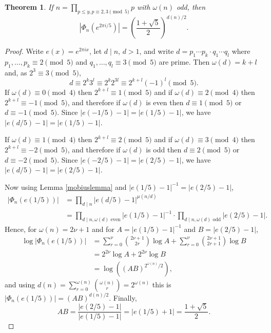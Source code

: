 \documentclass{article}
\newtheorem{theorem}{Theorem}
\theoremstyle{definition}
\begin{document}
\begin{theorem}
If $n=\prod_{p \leq y, p \equiv 2,3 \pmod{5}} p$ with $\omega(n)$  odd, then
\[
|\Phi_n(e^{2\pi i/5})| = \left( \frac{1+\sqrt{5}}{2} \right)^{d(n)/2}.
\]
\label{demr}
\end{theorem}
\begin{proof}
Write $e(x)=e^{2\pi ix}$, let $d \mid n$, $d>1$, and write $d=p_1\cdots p_k \cdot q_1 \cdots q_l$ where
$p_1,\ldots,p_k \equiv 2 \pmod{5}$ and $q_1,\ldots,q_l \equiv 3 \pmod{5}$ are prime. Then
$\omega(d) = k+l$ and, as $2^3 \equiv 3 \pmod{5}$,
\[
d \equiv 2^k 3^l \equiv 2^k 2^{3l} \equiv 2^{k+l} (-1)^l \pmod{5}.
\]
If $\omega(d) \equiv 0 \pmod{4}$ then $2^{k+l} \equiv 1 \pmod{5}$
and if $\omega(d) \equiv 2 \pmod{4}$ then
$2^{k+l}  \equiv -1 \pmod{5}$, and therefore if $\omega(d)$ is even then 
$d \equiv 1 \pmod{5}$ or $d \equiv -1 \pmod{5}$. Since $|e(-1/5)-1|=|e(1/5)-1|$, we have
$|e(d/5)-1| = |e(1/5)-1|$.

If $\omega(d) \equiv 1 \pmod{4}$ then $2^{k+l} \equiv 2 \pmod{5}$ and if $\omega(d) \equiv 3 \pmod{4}$ then
$2^{k+l} \equiv -2 \pmod{5}$, and therefore if $\omega(d)$ is odd then
$d \equiv 2 \pmod{5}$ or $d \equiv -2 \pmod{5}$. Since $|e(-2/5)-1|=|e(2/5)-1|$, we have
$|e(d/5)-1| = |e(2/5)-1|$.

Now using Lemma \ref{mobiuslemma} and $|e(1/5)-1|^{-1} =  |e(2/5)-1|$,
\begin{align*}
|\Phi_n(e(1/5))|&=\prod_{d \mid n} |e(d/5)-1|^{\mu(n/d)}\\
&=\prod_{d \mid n, \textrm{$\omega(d)$ even}}  |e(1/5)-1|^{-1}
\cdot \prod_{d \mid n, \textrm{$\omega(d)$ odd}}  |e(2/5)-1|.
\end{align*}
Hence, for $\omega(n)=2\nu+1$ and for $A= |e(1/5)-1|^{-1}$ and $B=|e(2/5)-1|$,
\begin{align*}
\log |\Phi_n(e(1/5))|&=\sum_{r=0}^\nu \binom{2\nu+1}{2r} \log A + \sum_{r=0}^\nu \binom{2\nu+1}{2r+1} \log B\\
&=2^{2\nu} \log A + 2^{2\nu} \log B\\
&=\log((AB)^{2^{\omega(n)} /2}),
\end{align*}
and using $d(n)=\sum_{r=0}^{\omega(n)} \binom{\omega(n)}{r} = 2^{\omega(n)}$ this is $|\Phi_n(e(1/5))| = (AB)^{d(n)/2}$.
Finally,
\[
AB = \frac{|e(2/5)-1|}{|e(1/5)-1|} =|e(1/5)+1|= \frac{1+\sqrt{5}}{2}.
\]
\end{proof}
\end{document}
